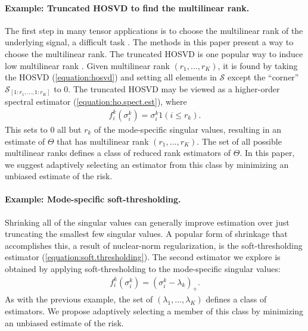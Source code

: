 \paragraph{Example: Truncated HOSVD to find the multilinear rank.}
The first step in many tensor applications is to choose the
multilinear rank of the underlying signal, a difficult task
\citep{timmerman2000three,kiers2003fast,ceulemans2006selecting}. The
methods in this paper present a way to choose the multilinear
rank. The truncated HOSVD is one popular way to induce low multilinear
rank \citep{de2000multilinear}. Given multilinear rank
$(r_1,\ldots,r_K)$, it is found by taking the HOSVD
(\ref{equation:hosvd}) and setting all elements in $\mathcal{S}$
except the ``corner'' $\mathcal{S}_{[1:r_1,\ldots,1:r_K]}$ to $0$. The
truncated HOSVD may be viewed as a higher-order spectral estimator
(\ref{equation:ho.spect.est}), where
\begin{align}
  \label{equation:trunc.shrink}
  f^k_i(\sigma_i^k) = \sigma_i^k1(i \leq r_k).
\end{align}
This sets to 0 all but $r_k$ of the mode-specific singular values,
resulting in an estimate of $\Theta$ that has multilinear rank
$(r_1,\ldots,r_K)$. The set of all possible multilinear ranks defines
a class of reduced rank estimators of $\Theta$. In this paper, we
suggest adaptively selecting an estimator from this class by
minimizing an unbiased estimate of the risk.


\paragraph{Example: Mode-specific soft-thresholding.}
Shrinking all of the singular values can generally improve estimation
over just truncating the smallest few singular values. A popular form
of shrinkage that accomplishes this, a result of nuclear-norm
regularization, is the soft-thresholding estimator
(\ref{equation:soft.thresholding}). The second estimator we explore is
obtained by applying soft-thresholding to the mode-specific singular
values:
\begin{align}
  \label{equation:mode.specific.soft}
  f^k_i(\sigma_i^k) = (\sigma_i^k - \lambda_k)_+.
\end{align}
As with the previous example, the set of
$(\lambda_1,\ldots,\lambda_K)$ defines a class of estimators. We
propose adaptively selecting a member of this class by minimizing an
unbiased estimate of the risk.

